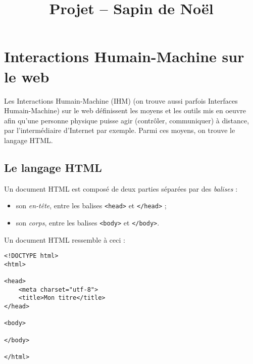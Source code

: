 \documentclass[a4paper]{article}
\begin{document}
\title{Projet -- Sapin de Noël}

\pagestyle{empty}

\author{}

\date{}

\maketitle{}

\thispagestyle{empty}

\section{Interactions Humain-Machine sur le web}
Les Interactions Humain-Machine (IHM) (on trouve aussi parfois Interfaces Humain-Machine) sur le web définissent les moyens et les outils mis en oeuvre afin qu'une personne physique puisse agir (contrôler, communiquer) à distance, par l'intermédiaire d'Internet par exemple. Parmi ces moyens, on trouve le langage HTML.

\subsection{Le langage HTML}
Un document HTML est composé de deux parties séparées par des \textit{balises} :
\begin{itemize}
  \item son \textit{en-tête}, entre les balises \texttt{<head>} et \texttt{</head>} ;
  \item son \textit{corps}, entre les balises \texttt{<body>} et \texttt{</body>}.
\end{itemize}

Un document HTML ressemble à ceci :

\begin{verbatim}
<!DOCTYPE html>
<html>

<head>
    <meta charset="utf-8">
    <title>Mon titre</title>
</head>

<body>

</body>

</html>
\end{verbatim}

\bigskip
\end{document}
